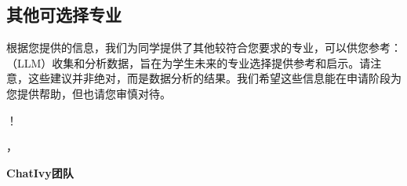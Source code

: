 \documentclass[12pt]{article}
\begin{document}
\begin{CJK*}{UTF8}{gbsn}
\newpage
\hspace{0pt}
\vspace{0cm}
\subsection*{其他可选择专业}
根据您提供的信息，我们为同学提供了其他较符合您要求的专业，可以供您参考：
\bigskip
\bigskip
\bigskip
{}（LLM）收集和分析数据，旨在为学生未来的专业选择提供参考和启示。请注意，这些建议并非绝对，而是数据分析的结果。我们希望这些信息能在申请阶段为您提供帮助，但也请您审慎对待。

\bigskip 
{}！

，

\noindent\textbf{ChatIvy团队}

\printbibliography
\clearpage\end{CJK*}
\end{document}
